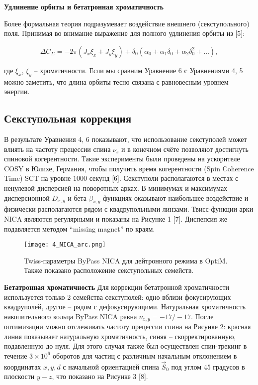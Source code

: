 \textbf{Удлинение орбиты и бетатронная хроматичность}

Более формальная теория подразумевает воздействие внешнего (секступольного) поля. Принимая во внимание выражение для полного удлинения орбиты из [5]:

\begin{equation}
\Delta C_\Sigma=-2\pi\left(J_x\xi_x+J_y\xi_y\right)+\delta_0\left(\alpha_0+\alpha_1\delta_0+\alpha_2\delta_0^2+\ldots\right),
\end{equation}

где $\xi_x$, $\xi_y$ – хроматичности. Если мы сравним Уравнение 6 с Уравнениями 4, 5 можно заметить, что длина орбиты тесно связана с равновесным уровнем энергии.

\subsection{Секступольная коррекция}\label{sec:EDM/Wien_filter_tracking/sextupole_correction}

\par В результате Уравнения 4, 6 показывают, что использование секступолей может влиять на частоту прецессии спина $\nu_s$ и в конечном счёте позволяют достигнуть спиновой когерентности. Такие эксперименты были проведены на ускорителе COSY в Юлихе, Германия, чтобы получить время когерентности (Spin Coherence Time) SCT на уровне $1000$ секунд [6]. Секступоли располагаются в местах с ненулевой дисперсией на поворотных арках. В минимумах и максимумах дисперсионной $D_{x,y}$ и бета $\beta_{x,y}$ функциях оказывают наибольшее воздействие и физически располагаются рядом с квадрупольными линзами. Твисс-функции арки NICA являются регулярными и показаны на Рисунке 1 [7]. Диспепсия же подавляется методом “missing magnet” по краям.

\begin{figure}[!h]
  \centering
   \texttt{[image: 4\_NICA\_arc.png]}
   \caption{Twiss-параметры ByPass NICA для дейтронного режима в OptiM. Также показано расположение секступольных семейств.}
   \label{fig:4_NICA_arc}
\end{figure}

\textbf{Бетатронная хроматичность}
Для коррекции бетатронной хроматичности используется только 2 семейства секступолей: одно вблизи фокусирующих квадруполей, другое – рядом с дефокусирующими. Натуральная хроматичность накопительного кольца ByPass NICA равна $\nu_{x,y}=-17/-17$. После оптимизации можно отслеживать частоту прецессии спина на Рисунке 2: красная линия показывает натуральную хроматичность, синяя – скорректированную, подавленную до нуля. Для этого случая также был осуществлен спин-трекинг в течение $3\times{10}^6$ оборотов для частиц с различным начальным отклонением в координатах $x, y, d$ с начальной ориентацией спина ${\vec{S}}_0$ под углом $45$ градусов в плоскости $y-z$, что показано на Рисунке 3 [8].

